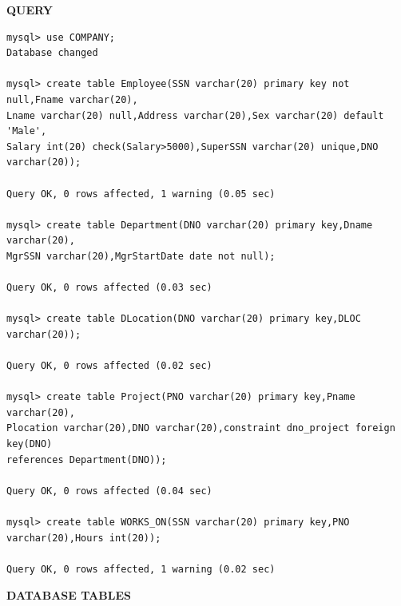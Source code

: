 \documentclass[a4paper,12pt]{report}
\begin{document}
	\begin{flushleft}
		\textbf{QUERY }
	\end{flushleft}
\begin{verbatim}
mysql> use COMPANY;
Database changed

mysql> create table Employee(SSN varchar(20) primary key not null,Fname varchar(20),
Lname varchar(20) null,Address varchar(20),Sex varchar(20) default 'Male',
Salary int(20) check(Salary>5000),SuperSSN varchar(20) unique,DNO varchar(20));

Query OK, 0 rows affected, 1 warning (0.05 sec)

mysql> create table Department(DNO varchar(20) primary key,Dname varchar(20),
MgrSSN varchar(20),MgrStartDate date not null);

Query OK, 0 rows affected (0.03 sec)

mysql> create table DLocation(DNO varchar(20) primary key,DLOC varchar(20));

Query OK, 0 rows affected (0.02 sec)

mysql> create table Project(PNO varchar(20) primary key,Pname varchar(20),
Plocation varchar(20),DNO varchar(20),constraint dno_project foreign key(DNO)
references Department(DNO));

Query OK, 0 rows affected (0.04 sec)

mysql> create table WORKS_ON(SSN varchar(20) primary key,PNO varchar(20),Hours int(20));

Query OK, 0 rows affected, 1 warning (0.02 sec)

\end{verbatim}
\newpage
	\begin{flushleft}
		\textbf{DATABASE TABLES}
	\end{flushleft} 
\end{document}
